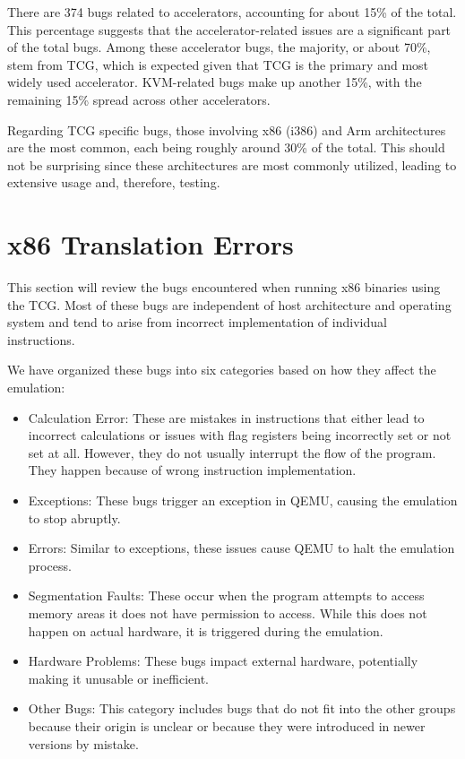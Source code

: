 There are 374 bugs related to accelerators, accounting for about 15\% of the total.
This percentage suggests that the accelerator-related issues are a significant part of the total bugs.
Among these accelerator bugs, the majority, or about 70\%, stem from \ac{TCG}, which is expected given that \ac{TCG} is the primary and most widely used accelerator.
KVM-related bugs make up another 15\%, with the remaining 15\% spread across other accelerators.

Regarding \ac{TCG} specific bugs, those involving x86 (i386) and Arm architectures are the most common, each being roughly around 30\% of the total.
This should not be surprising since these architectures are most commonly utilized, leading to extensive usage and, therefore, testing.

\section{x86 Translation Errors}
This section will review the bugs encountered when running x86 binaries using the \ac{TCG}.
Most of these bugs are independent of host architecture and operating system and tend to arise from incorrect implementation of individual instructions.

We have organized these bugs into six categories based on how they affect the emulation:
\begin{itemize}
    \item Calculation Error: These are mistakes in instructions that either lead to incorrect calculations or issues with flag registers being incorrectly set or not set at all. However, they do not usually interrupt the flow of the program. They happen because of wrong instruction implementation.
    \item Exceptions: These bugs trigger an exception in \ac{QEMU}, causing the emulation to stop abruptly.
    \item Errors: Similar to exceptions, these issues cause \ac{QEMU} to halt the emulation process.
    \item Segmentation Faults: These occur when the program attempts to access memory areas it does not have permission to access. While this does not happen on actual hardware, it is triggered during the emulation.
    \item Hardware Problems: These bugs impact external hardware, potentially making it unusable or inefficient.
    \item Other Bugs: This category includes bugs that do not fit into the other groups because their origin is unclear or because they were introduced in newer versions by mistake.
\end{itemize}

